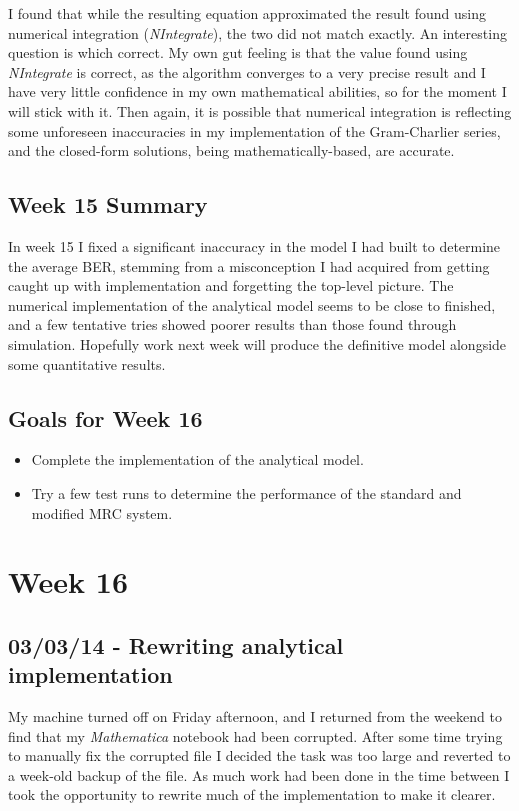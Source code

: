 I found that while the resulting equation approximated the result found
using numerical integration (\emph{NIntegrate}), the two did not match
exactly. An interesting question is which correct. My own gut feeling is
that the value found using \emph{NIntegrate} is correct, as the
algorithm converges to a very precise result and I have very little
confidence in my own mathematical abilities, so for the moment I will
stick with it. Then again, it is possible that numerical integration is
reflecting some unforeseen inaccuracies in my implementation of the
Gram-Charlier series, and the closed-form solutions, being
mathematically-based, are accurate.

\subsection{Week 15 Summary}

In week 15 I fixed a significant inaccuracy in the model I had built to
determine the average BER, stemming from a misconception I had acquired
from getting caught up with implementation and forgetting the top-level
picture. The numerical implementation of the analytical model seems to
be close to finished, and a few tentative tries showed poorer results
than those found through simulation. Hopefully work next week will
produce the definitive model alongside some quantitative results.

\subsection{Goals for Week 16}

\begin{itemize}
\itemsep1pt\parskip0pt
\item
  Complete the implementation of the analytical model.
\item
  Try a few test runs to determine the performance of the standard and
  modified MRC system.
\end{itemize}

\section{Week 16}

\subsection{03/03/14 - Rewriting analytical implementation}

My machine turned off on Friday afternoon, and I returned from the
weekend to find that my \emph{Mathematica} notebook had been corrupted.
After some time trying to manually fix the corrupted file I decided the
task was too large and reverted to a week-old backup of the file. As
much work had been done in the time between I took the opportunity to
rewrite much of the implementation to make it clearer.


